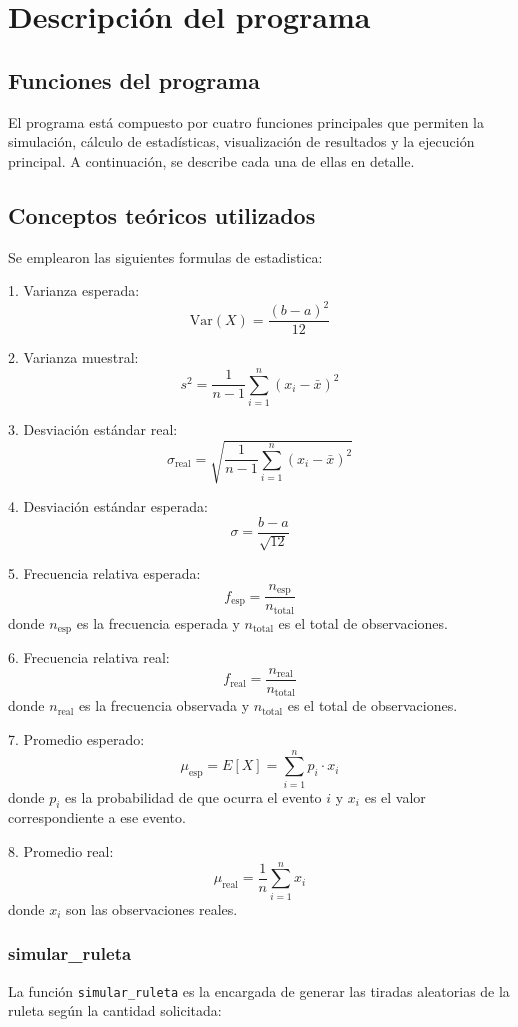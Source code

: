 \documentclass{article}
\begin{document}
\section{Descripción del programa}
\subsection{Funciones del programa}
El programa está compuesto por cuatro funciones principales que permiten la simulación, cálculo de estadísticas, visualización de resultados y la ejecución principal. A continuación, se describe cada una de ellas en detalle.

\subsection{Conceptos teóricos utilizados}
Se emplearon las siguientes formulas de estadistica:

1. Varianza esperada:
\[
\text{Var}(X) = \frac{(b - a)^2}{12}
\]

2. Varianza muestral:
\[
s^2 = \frac{1}{n-1} \sum_{i=1}^{n} (x_i - \bar{x})^2
\]

3. Desviación estándar real:
\[
\sigma_{\text{real}} = \sqrt{\frac{1}{n-1} \sum_{i=1}^{n} (x_i - \bar{x})^2}
\]

4. Desviación estándar esperada:
\[
\sigma = \frac{b - a}{\sqrt{12}}
\]

5. Frecuencia relativa esperada:
\[
f_{\text{esp}} = \frac{n_{\text{esp}}}{n_{\text{total}}}
\]
donde \( n_{\text{esp}} \) es la frecuencia esperada y \( n_{\text{total}} \) es el total de observaciones.

6. Frecuencia relativa real:
\[
f_{\text{real}} = \frac{n_{\text{real}}}{n_{\text{total}}}
\]
donde \( n_{\text{real}} \) es la frecuencia observada y \( n_{\text{total}} \) es el total de observaciones.

7. Promedio esperado:
\[
\mu_{\text{esp}} = E[X] = \sum_{i=1}^{n} p_i \cdot x_i
\]
donde \( p_i \) es la probabilidad de que ocurra el evento \( i \) y \( x_i \) es el valor correspondiente a ese evento.

8. Promedio real:
\[
\mu_{\text{real}} = \frac{1}{n} \sum_{i=1}^{n} x_i
\]
donde \( x_i \) son las observaciones reales.

\subsubsection{simular\_ruleta}
La función \texttt{simular\_ruleta} es la encargada de generar las tiradas aleatorias de la ruleta según la cantidad solicitada:
\end{document}
